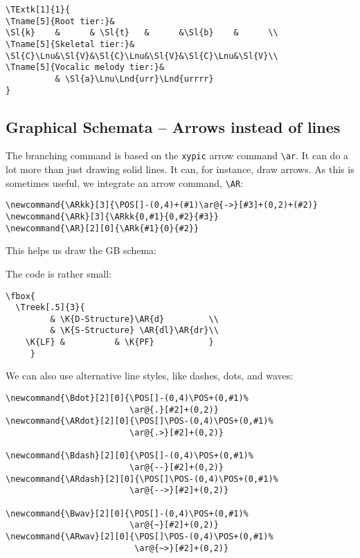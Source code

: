 \documentclass[12pt,a4paper]{article}
\begin{document}
\begin{verbatim}
\TExtk[1]{1}{
\Tname[5]{Root tier:}&
\Sl{k}    &      & \Sl{t}   &      &\Sl{b}    &      \\
\Tname[5]{Skeletal tier:}&
\Sl{C}\Lnu&\Sl{V}&\Sl{C}\Lnu&\Sl{V}&\Sl{C}\Lnu&\Sl{V}\\
\Tname[5]{Vocalic melody tier:}&
          & \Sl{a}\Lnu\Lnd{urr}\Lnd{urrrr}
}
\end{verbatim}


\subsection{Graphical Schemata -- Arrows instead of lines}

The branching command is based on the \texttt{xypic} arrow command
\verb|\ar|. It can do a lot more than just drawing solid lines. It can, for
instance, draw arrows. As this is sometimes useful, we integrate an arrow
command, \verb|\AR|:

\begin{verbatim}
\newcommand{\ARkk}[3]{\POS[]-(0,4)+(#1)\ar@{->}[#3]+(0,2)+(#2)}
\newcommand{\ARk}[3]{\ARkk{0,#1}{0,#2}{#3}}
\newcommand{\AR}[2][0]{\ARk{#1}{0}{#2}}
\end{verbatim}

This helps us draw the GB schema:

\begin{minipage}[t]{4cm}
\end{minipage}
\begin{minipage}[t]{10cm}
  The code is rather small:
\begin{verbatim}
\fbox{
  \Treek[.5]{3}{
         & \K{D-Structure}\AR{d}         \\
         & \K{S-Structure} \AR{dl}\AR{dr}\\
    \K{LF} &          & \K{PF}           }
     }
\end{verbatim}
\end{minipage}

We can also use alternative line styles, like dashes, dots, and waves:


\begin{verbatim}
\newcommand{\Bdot}[2][0]{\POS[]-(0,4)\POS+(0,#1)%
                         \ar@{.}[#2]+(0,2)}
\newcommand{\ARdot}[2][0]{\POS[]\POS-(0,4)\POS+(0,#1)%
                         \ar@{.>}[#2]+(0,2)}

\newcommand{\Bdash}[2][0]{\POS[]-(0,4)\POS+(0,#1)%
                         \ar@{--}[#2]+(0,2)}
\newcommand{\ARdash}[2][0]{\POS[]\POS-(0,4)\POS+(0,#1)%
                         \ar@{-->}[#2]+(0,2)}

\newcommand{\Bwav}[2][0]{\POS[]-(0,4)\POS+(0,#1)%
                         \ar@{~}[#2]+(0,2)}
\newcommand{\ARwav}[2][0]{\POS[]\POS-(0,4)\POS+(0,#1)%
                          \ar@{~>}[#2]+(0,2)}
\end{verbatim}\enlargethispage{-2\baselineskip}
\end{document}
